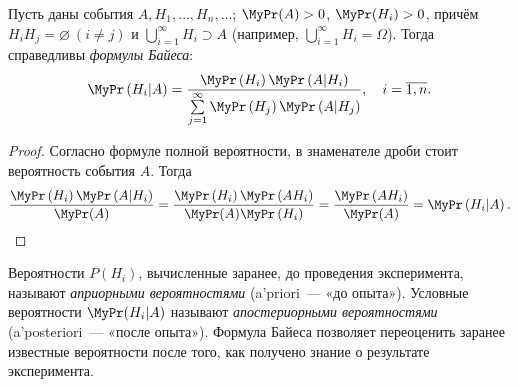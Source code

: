 \begin{namedthm}
	Пусть даны события $A, H_1, \ldots, H_n, \ldots$; ${\MyPr(A) > 0}$, ${\MyPr(H_i) > 0}$, причём $H_i H_j = \varnothing ~(i \neq j)$ и $\bigcup\limits_{i=1}^\infty H_i \supset A$ (например, $\bigcup\limits_{i=1}^{\infty}H_i = \Omega$). Тогда справедливы \textit{формулы Байеса}:
	\begin{equation*}
		\MyPr\left(H_{i} | A\right)= \frac{\MyPr\left(H_{i}\right) \MyPr\left(A | H_{i}\right)}{\sum\limits_{j=1}^{\infty} \MyPr\left(H_{j}\right) \MyPr\left(A | H_{j}\right)}, \quad i = \overline{1,n}.
	\end{equation*}
\end{namedthm}
\begin{proof}
	Согласно формуле полной вероятности, в знаменателе дроби стоит вероятность события $A$. 
	Тогда
	\begin{equation*}
		\frac{\MyPr\left(H_{i}\right) \MyPr\left(A | H_{i}\right)}{\MyPr(A)}=\frac{\MyPr\left(H_{i}\right) \MyPr\left(A H_{i}\right)}{\MyPr(A) \MyPr\left(H_{i}\right)}=\frac{\MyPr\left(A H_{i}\right)}{\MyPr(A)}=\MyPr\left(H_{i} | A\right). 
	\end{equation*}
\end{proof}

Вероятности $P(H_i)$, вычисленные заранее, до проведения эксперимента, называют \textit{априорными вероятностями} (a’priori~--- «до опыта»). 
Условные вероятности $\MyPr(H_i | A)$ называют \textit{апостериорными вероятностями} (a’posteriori~--- «после опыта»). 
Формула Байеса позволяет переоценить заранее известные вероятности после того, как получено знание о результате эксперимента.


